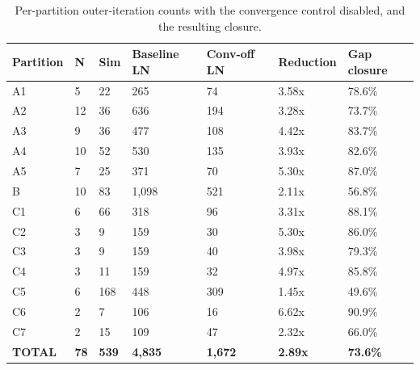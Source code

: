 \begin{table}[h]
\centering
\small
\begin{tabular}{|l|l|l|l|l|l|l|}
\hline
Partition & N & Sim & Baseline LN & Conv-off LN & Reduction & Gap closure \\
\hline
A1 & 5 & 22 & 265 & 74 & 3.58x & 78.6\% \\ \hline
A2 & 12 & 36 & 636 & 194 & 3.28x & 73.7\% \\ \hline
A3 & 9 & 36 & 477 & 108 & 4.42x & 83.7\% \\ \hline
A4 & 10 & 52 & 530 & 135 & 3.93x & 82.6\% \\ \hline
A5 & 7 & 25 & 371 & 70 & 5.30x & 87.0\% \\ \hline
B & 10 & 83 & 1,098 & 521 & 2.11x & 56.8\% \\ \hline
C1 & 6 & 66 & 318 & 96 & 3.31x & 88.1\% \\ \hline
C2 & 3 & 9 & 159 & 30 & 5.30x & 86.0\% \\ \hline
C3 & 3 & 9 & 159 & 40 & 3.98x & 79.3\% \\ \hline
C4 & 3 & 11 & 159 & 32 & 4.97x & 85.8\% \\ \hline
C5 & 6 & 168 & 448 & 309 & 1.45x & 49.6\% \\ \hline
C6 & 2 & 7 & 106 & 16 & 6.62x & 90.9\% \\ \hline
C7 & 2 & 15 & 109 & 47 & 2.32x & 66.0\% \\ \hline
\textbf{TOTAL} & \textbf{78} & \textbf{539} & \textbf{4,835} & \textbf{1,672} & \textbf{2.89x} & \textbf{73.6\%} \\ \hline
\end{tabular}
\caption{Per-partition outer-iteration counts with the convergence control disabled, and the resulting closure.}
\label{tab:eval-f20-iter-counts}
\label{tab:eval-gap-closure}
\end{table}

